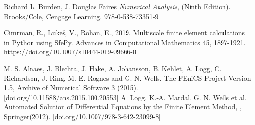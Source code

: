 \documentclass[a4paper]{article}
\begin{document}
\begin{thebibliography}{99}


 Richard L. Burden, J. Douglas Faires \textit{Numerical Analysis}, (Ninth Edition). Brooks/Cole, Cengage Learning. 978-0-538-73351-9

 Cimrman, R., Lukeš, V., Rohan, E., 2019. Multiscale finite element calculations in Python using SfePy. Advances in Computational Mathematics 45, 1897-1921. https://doi.org/10.1007/s10444-019-09666-0

M. S. Alnaes, J. Blechta, J. Hake, A. Johansson, B. Kehlet, A. Logg, C. Richardson, J. Ring, M. E. Rognes and G. N. Wells. The FEniCS Project Version 1.5, Archive of Numerical Software 3 (2015). [doi.org/10.11588/ans.2015.100.20553]
\bibitem{}A. Logg, K.-A. Mardal, G. N. Wells et al. Automated Solution of Differential Equations by the Finite Element Method, , Springer(2012). [doi.org/10.1007/978-3-642-23099-8]





\end{thebibliography}
\end{document}
